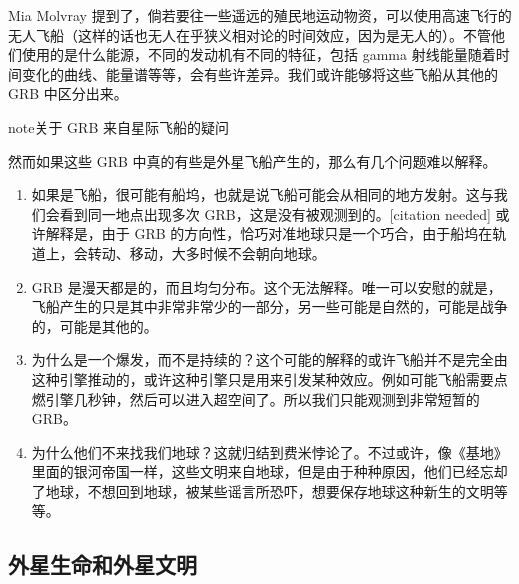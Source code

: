 \documentclass[letterpaper,10pt,english]{sphinxmanual}
\begin{document}
Mia Molvray 提到了，倘若要往一些遥远的殖民地运动物资，可以使用高速飞行的无人飞船（这样的话也无人在乎狭义相对论的时间效应，因为是无人的）。不管他们使用的是什么能源，不同的发动机有不同的特征，包括 gamma 射线能量随着时间变化的曲线、能量谱等等，会有些许差异。我们或许能够将这些飞船从其他的 GRB 中区分出来。

\begin{notice}{note}{关于 GRB 来自星际飞船的疑问}

然而如果这些 GRB 中真的有些是外星飞船产生的，那么有几个问题难以解释。
\begin{enumerate}
\item {} 
如果是飞船，很可能有船坞，也就是说飞船可能会从相同的地方发射。这与我们会看到同一地点出现多次 GRB，这是没有被观测到的。{[}citation needed{]} 或许解释是，由于 GRB 的方向性，恰巧对准地球只是一个巧合，由于船坞在轨道上，会转动、移动，大多时候不会朝向地球。

\item {} 
GRB 是漫天都是的，而且均匀分布。这个无法解释。唯一可以安慰的就是，飞船产生的只是其中非常非常少的一部分，另一些可能是自然的，可能是战争的，可能是其他的。

\item {} 
为什么是一个爆发，而不是持续的？这个可能的解释的或许飞船并不是完全由这种引擎推动的，或许这种引擎只是用来引发某种效应。例如可能飞船需要点燃引擎几秒钟，然后可以进入超空间了。所以我们只能观测到非常短暂的 GRB。

\item {} 
为什么他们不来找我们地球？这就归结到费米悖论了。不过或许，像《基地》里面的银河帝国一样，这些文明来自地球，但是由于种种原因，他们已经忘却了地球，不想回到地球，被某些谣言所恐吓，想要保存地球这种新生的文明等等。

\end{enumerate}
\end{notice}


\subsection{外星生命和外星文明}
\label{physics:id14}
\end{document}
